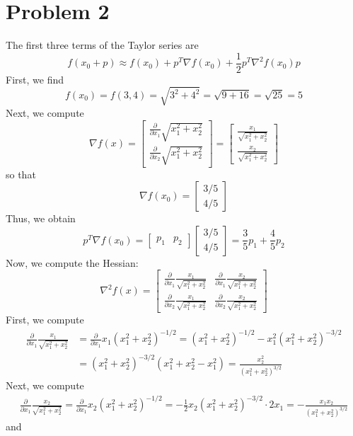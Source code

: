 \documentclass[12pt]{article}
\begin{document}
\section*{Problem 2}
The first three terms of the Taylor series are
\[
f(x_0 + p) \approx f(x_0) + p^T \nabla f(x_0) + \frac{1}{2} p^T \nabla^2 f(x_0) p
\]
First, we find
\[
f(x_0) = f(3,4) = \sqrt{3^2+4^2} = \sqrt{9+16} = \sqrt{25} = 5
\] Next, we compute
\[
\nabla f(x) = 
\begin{bmatrix}
\frac{\partial}{\partial x_1} \sqrt{x_1^2 + x_2^2}\\
\frac{\partial}{\partial x_2} \sqrt{x_1^2+x_2^2}
\end{bmatrix}
=
\begin{bmatrix}
\frac{x_1}{\sqrt{x_1^2+x_2^2}}\\
\frac{x_2}{\sqrt{x_1^2+x_2^2}}
\end{bmatrix}
\] so that
\[
\nabla f(x_0) =
\begin{bmatrix}
3/5\\
4/5
\end{bmatrix}
\] Thus, we obtain
\[
p^T \nabla f(x_0) = 
\begin{bmatrix}
p_1 & p_2
\end{bmatrix} 
\begin{bmatrix}
3/5\\
4/5
\end{bmatrix} = \frac{3}{5}p_1 + \frac{4}{5}p_2
\] Now, we compute the Hessian:
\[
\nabla^2 f(x) = 
\begin{bmatrix}
\frac{\partial}{\partial x_1} \frac{x_1}{\sqrt{x_1^2+x_2^2}} & \frac{\partial}{\partial x_1} \frac{x_2}{\sqrt{x_1^2+x_2^2}}\\
\frac{\partial}{\partial x_2} \frac{x_1}{\sqrt{x_1^2+x_2^2}} & \frac{\partial}{\partial x_2} \frac{x_2}{\sqrt{x_1^2+x_2^2}}
\end{bmatrix}
\] First, we compute
\begin{align*}
\frac{\partial}{\partial x_1} \frac{x_1}{\sqrt{x_1^2+x_2^2}} &= \frac{\partial}{\partial x_1}  x_1(x_1^2+x_2^2)^{-1/2} = (x_1^2+x_2^2)^{-1/2} - x_1^2(x_1^2+x_2^2)^{-3/2}\\
&= (x_1^2+x_2^2)^{-3/2} (x_1^2 + x_2^2 - x_1^2) = \frac{x_2^2}{(x_1^2+x_2^2)^{3/2}}
\end{align*} Next, we compute
\begin{align*}
 \frac{\partial}{\partial x_1} \frac{x_2}{\sqrt{x_1^2+x_2^2}} =  \frac{\partial}{\partial x_1} x_2(x_1^2+x_2^2)^{-1/2} = -\frac{1}{2}x_2(x_1^2+x_2^2)^{-3/2} \cdot 2x_1 = -\frac{x_1x_2}{(x_1^2+x_2^2)^{3/2}}
\end{align*} and
\end{document}
